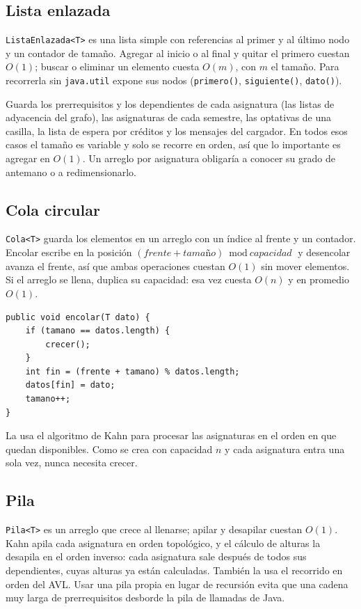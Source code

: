 \documentclass[11pt,letterpaper]{article}
\begin{document}
\subsection{Lista enlazada}
\texttt{ListaEnlazada<T>} es una lista simple con referencias al primer y al último nodo y un contador de tamaño. Agregar al inicio o al final y quitar el primero cuestan $O(1)$; buscar o eliminar un elemento cuesta $O(m)$, con $m$ el tamaño. Para recorrerla sin \texttt{java.util} expone sus nodos (\texttt{primero()}, \texttt{siguiente()}, \texttt{dato()}).

Guarda los prerrequisitos y los dependientes de cada asignatura (las listas de adyacencia del grafo), las asignaturas de cada semestre, las optativas de una casilla, la lista de espera por créditos y los mensajes del cargador. En todos esos casos el tamaño es variable y solo se recorre en orden, así que lo importante es agregar en $O(1)$. Un arreglo por asignatura obligaría a conocer su grado de antemano o a redimensionarlo.

\subsection{Cola circular}
\texttt{Cola<T>} guarda los elementos en un arreglo con un índice al frente y un contador. Encolar escribe en la posición $(\textit{frente} + \textit{tamaño}) \bmod \textit{capacidad}$ y desencolar avanza el frente, así que ambas operaciones cuestan $O(1)$ sin mover elementos. Si el arreglo se llena, duplica su capacidad: esa vez cuesta $O(n)$ y en promedio $O(1)$.
\begin{lstlisting}[style=java]
public void encolar(T dato) {
    if (tamano == datos.length) {
        crecer();
    }
    int fin = (frente + tamano) % datos.length;
    datos[fin] = dato;
    tamano++;
}
\end{lstlisting}

La usa el algoritmo de Kahn para procesar las asignaturas en el orden en que quedan disponibles. Como se crea con capacidad $n$ y cada asignatura entra una sola vez, nunca necesita crecer.

\subsection{Pila}
\texttt{Pila<T>} es un arreglo que crece al llenarse; apilar y desapilar cuestan $O(1)$. Kahn apila cada asignatura en orden topológico, y el cálculo de alturas la desapila en el orden inverso: cada asignatura sale después de todos sus dependientes, cuyas alturas ya están calculadas. También la usa el recorrido en orden del AVL. Usar una pila propia en lugar de recursión evita que una cadena muy larga de prerrequisitos desborde la pila de llamadas de Java.
\end{document}
